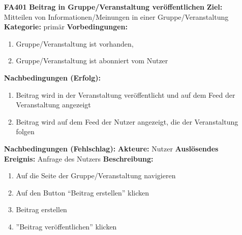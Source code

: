 \documentclass[parskip=full]{scrartcl}
\begin{document}
\begin{itemize}[nosep]
			\item[\textbf{FA401}]\textbf{Beitrag in Gruppe/Veranstaltung veröffentlichen}
			\newline \textbf{Ziel:} Mitteilen von Informationen/Meinungen in einer Gruppe/Veranstaltung
			\newline \textbf{Kategorie:} primär
			\newline \textbf{Vorbedingungen:}
			\begin{enumerate}[nosep]
				\item Gruppe/Veranstaltung ist vorhanden,
				\item Gruppe/Veranstaltung ist abonniert vom Nutzer
			\end{enumerate}
			\textbf{Nachbedingungen (Erfolg):}
			\begin{enumerate}[nosep]
				\item Beitrag wird in der Veranstaltung veröffentlicht und auf dem \gls{Feed} der Veranstaltung angezeigt
				\item Beitrag wird auf dem \gls{Feed} der Nutzer angezeigt, die der Veranstaltung folgen
			\end{enumerate}
			\textbf{Nachbedingungen (Fehlschlag):}
			\newline \textbf{Akteure:} Nutzer
			\newline \textbf{Auslösendes Ereignis:} Anfrage des Nutzers
			\newline \textbf{Beschreibung:}
			\begin{enumerate}[nosep]
				\item Auf die Seite der Gruppe/Veranstaltung navigieren
				\item Auf den Button “Beitrag erstellen” klicken
				\item Beitrag erstellen
				\item ”Beitrag veröffentlichen” klicken\\
			\end{enumerate}
			

\end{itemize}
\end{document}
